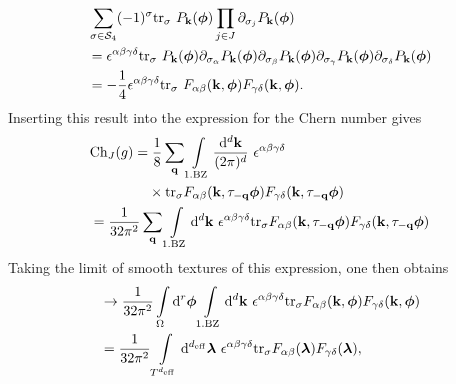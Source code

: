\documentclass[
    10pt,
    aps,
    prb,
	longbibliography,
    twocolumn,
    floatfix,
    superscriptaddress,
]{revtex4-2}
\begin{document}
\begin{align}
& \sum_{\sigma \in {\mathcal S}_{4}} (-1)^\sigma \mathrm{tr}_\sigma ~ 
P_{\mathbf{k}}(\boldsymbol{\phi}) \prod_{j \in J} \partial_{\sigma_j}P_{\mathbf{k}}(\boldsymbol{\phi}) 
 \\ & =
\epsilon^{\alpha\beta\gamma\delta}
\mathrm{tr}_\sigma ~
P_{\mathbf{k}}(\boldsymbol{\phi}) \partial_{\sigma_\alpha }P_{\mathbf{k}}(\boldsymbol{\phi})
\partial_{\sigma_\beta }P_{\mathbf{k}}(\boldsymbol{\phi})
\partial_{\sigma_\gamma }P_{\mathbf{k}}(\boldsymbol{\phi})
\partial_{\sigma_\delta }P_{\mathbf{k}}(\boldsymbol{\phi})
\notag \\
& = - \frac{1}{4}
\epsilon^{\alpha\beta\gamma\delta}
\mathrm{tr}_\sigma ~F_{\alpha \beta}(\mathbf{k}, \boldsymbol{\phi}) F_{\gamma\delta}(\mathbf{k}, \boldsymbol{\phi}) .
\end{align}
Inserting this result into the expression for the Chern number gives 
\begin{align}
	&{\rm Ch}_{J}(g) = \frac{1}{8 }\sum_{\vec{q}}
    \int\limits_{\mathrm{1.BZ}} \frac{\dd^d \vec{k}}{(2\pi)^d}~ \epsilon^{\alpha\beta\gamma\delta}
    \notag \\
    & \phantom{{\rm Ch}_{J}(g) = } \times
 \tr_\sigma F_{\alpha \beta}(\vec{k}, \tau_{-\vec{q}}\boldsymbol{\phi}) F_{\gamma\delta}(\vec{k}, \tau_{-\vec{q}}\boldsymbol{\phi}) 
 \notag \\
 & = \frac{1}{32 \pi^2}\sum_{\vec{q}}
 \int\limits_{\mathrm{1.BZ}}\dd^d \vec{k} ~ \epsilon^{\alpha\beta\gamma\delta}
 \tr_\sigma F_{\alpha \beta}(\vec{k}, \tau_{-\vec{q}}\boldsymbol{\phi}) F_{\gamma\delta}(\vec{k}, \tau_{-\vec{q}}\boldsymbol{\phi}) 
\end{align}
Taking the limit of smooth textures of this expression, one then obtains
\begin{align}
 & \to \frac{1}{32 \pi^2} \int\limits_{\Omega} \mathrm{d}^r\boldsymbol{\phi}
 \int\limits_{\mathrm{1.BZ}} \mathrm{d}^d \mathbf{k} ~ \epsilon^{\alpha\beta\gamma\delta}
 \mathrm{tr}_\sigma F_{\alpha \beta}(\mathbf{k},\boldsymbol{\phi}) F_{\gamma\delta}(\mathbf{k}, \boldsymbol{\phi}) 
 \notag \\
 & = \frac{1}{32 \pi^2} \int\limits_{T^{{d_\mathrm{eff}}}}  \mathrm{d}^{d_\mathrm{eff}} \boldsymbol{\lambda}
  ~ \epsilon^{\alpha\beta\gamma\delta}
 \mathrm{tr}_\sigma F_{\alpha \beta}(\boldsymbol{\lambda}) F_{\gamma\delta}(\boldsymbol{\lambda}) ,
\end{align}
\end{document}
